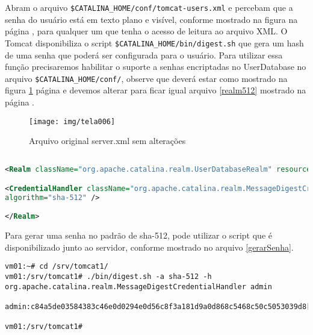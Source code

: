 


Abram o arquivo \texttt{\$CATALINA\_HOME/conf/tomcat-users.xml} e percebam que a senha do usuário está em texto plano e visível, conforme mostrado na figura  na página \pageref{fig:tomcat-users-texto-plano}, para qualquer um que tenha o acesso de leitura ao arquivo XML. O Tomcat disponibiliza o script \texttt{\$CATALINA\_HOME/bin/digest.sh} que gera um hash de uma senha que poderá ser configurada para o usuário. Para utilizar essa função precisaremos habilitar o suporte a senhas encriptadas no UserDatabase no arquivo \texttt{\$CATALINA\_HOME/conf/}, observe que deverá estar como mostrado na figura \ref{fig:tomcat-realm-nativo} página \pageref{fig:tomcat-realm-nativo} e devemos alterar para ficar igual arquivo \ref{realm512} mostrado na página \pageref{realm512}.

\begin{figure}[H]
	\centering
	\caption[server.xml]{Arquivo original server.xml sem alterações}
	\texttt{[image: img/tela006]}
	\label{fig:tomcat-realm-nativo}
\end{figure}


\begin{lstlisting}[language=xml, caption=\firacoderetina{server.xml} com as modificações para usar hash na senha, basicstyle=\scriptsize\firacoderetina, 
label=realm512, showspaces=false, showtabs=false, showstringspaces='', firstnumber=139]	

<Realm className="org.apache.catalina.realm.UserDatabaseRealm" resourceName="UserDatabase">

<CredentialHandler className="org.apache.catalina.realm.MessageDigestCredentialHandler"
algorithm="sha-512" />

</Realm>

\end{lstlisting}

Para gerar uma senha no padrão de sha-512, pode utilizar o script que é disponibilizado junto ao servidor, conforme mostrado no arquivo \ref{gerarSenha}.	

\begin{lstlisting}[breaklines=true,basicstyle=\ttfamily, 
label=gerarSenha ,
breaklines=true,caption=\firacoderetina gerando senha,
postbreak=\mbox{\textcolor{red}{$\hookrightarrow$}\space},
showstringspaces=false]
vm01:~# cd /srv/tomcat1/
vm01:/srv/tomcat1# ./bin/digest.sh -a sha-512 -h org.apache.catalina.realm.MessageDigestCredentialHandler admin

admin:c84a5de03584383c46e0d0294e0d56c8f3a181d9a0d868c5468c50c5053039d8[...] 

vm01:/srv/tomcat1#

\end{lstlisting}

